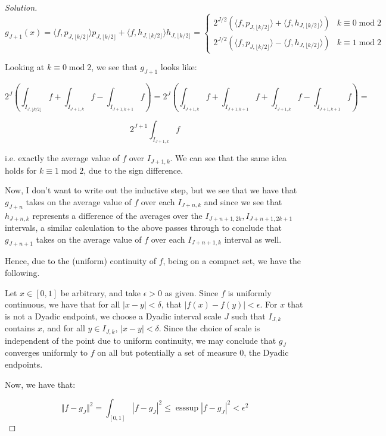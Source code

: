 \documentclass[10pt]{article}
\begin{document}
\begin{proof}[Solution]
$$ g_{J+1}(x) = \langle f, p_{J,\lfloor k/2 \rfloor} \rangle p_{J,\lfloor k/2 \rfloor } + \langle f, h_{J,\lfloor k/2 \rfloor} \rangle h_{J,\lfloor k/2 \rfloor}  = \begin{cases}  2^{J/2} (\langle f, p_{J,\lfloor k/2 \rfloor} \rangle +  \langle f, h_{J,\lfloor k/2 \rfloor} \rangle) &  k \equiv 0 \operatorname{mod} 2 \\ 2^{J/2} (\langle f, p_{J,\lfloor k/2 \rfloor}\rangle -  \langle f, h_{J,\lfloor k/2 \rfloor}\rangle)  &  k \equiv 1 \operatorname{mod} 2  \end{cases}$$

Looking at $ k \equiv 0 \operatorname{mod} 2$, we see that $g_{J+1}$ looks like:

$$ 2^{J}\left( \int_{I_{J,\lfloor k/2 \rfloor}} f + \int_{I_{J+1, k}} f - \int_{I_{J+1, k+1}} f \right) =  2^{J}\left( \int_{I_{J+1,k}} f + \int_{I_{J+1, k+1}}f + \int_{I_{J+1, k}} f - \int_{I_{J+1, k+1}}f \right) = $$

$$ 2^{J+1} \int_{I_{J+1, k}} f $$

i.e. exactly the average value of $f$ over $I_{J+1, k}$. We can see that the same idea holds for $k \equiv 1 \operatorname{mod} 2$, due to the sign difference.

Now, I don't want to write out the inductive step, but we see that we have that $g_{J+n}$ takes on the average value of $f$ over each $I_{J+n, k}$ and since we see that $h_{J+n, k}$ represents a difference of the averages over the $I_{J+n+1, 2k}, I_{J+n+1, 2k+1}$ intervals, a similar calculation to the above passes through to conclude that $g_{J+n+1}$ takes on the average value of $f$ over each $I_{J+n+1, k}$ interval as well.

Hence, due to the (uniform) continuity of $f$, being on a compact set, we have the following.

Let $x \in [0,1]$ be arbitrary, and take $\epsilon > 0$ as given. Since $f$ is uniformly continuous, we have that for all $|x - y | < \delta$, that $|f(x) - f(y)| < \epsilon$. For $x$ that is not a Dyadic endpoint, we choose a Dyadic interval scale $J$ such that $I_{J, k}$ contains $x$, and for all $y \in I_{J,k}$, $|x - y| < \delta$. Since the choice of scale is independent of the point due to uniform continuity, we may conclude that $g_J$ converges uniformly to $f$ on all but potentially a set of measure 0, the Dyadic endpoints.

Now, we have that:

$$ \Vert f - g_J \Vert^2 = \int_{[0,1]} | f - g_J |^2 \leq \operatorname{esssup} | f - g_J |^2 < \epsilon^2 $$


\end{proof}
\end{document}

